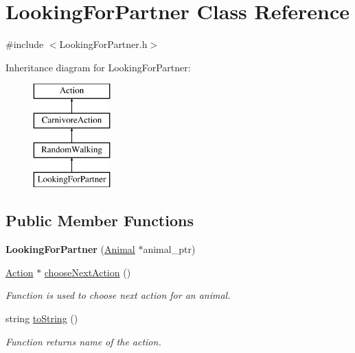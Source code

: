 \hypertarget{class_looking_for_partner}{}\section{Looking\+For\+Partner Class Reference}
\label{class_looking_for_partner}


{\ttfamily \#include $<$Looking\+For\+Partner.\+h$>$}

Inheritance diagram for Looking\+For\+Partner\+:\begin{figure}[H]
\begin{center}
\leavevmode
\includegraphics[height=4.000000cm]{class_looking_for_partner}
\end{center}
\end{figure}
\subsection*{Public Member Functions}
\begin{DoxyCompactItemize}
\item 
\hypertarget{class_looking_for_partner_a52b41dd23b47cdeae8ba927b50aa9403}{}{\bfseries Looking\+For\+Partner} (\hyperlink{class_animal}{Animal} $\ast$animal\+\_\+ptr)\label{class_looking_for_partner_a52b41dd23b47cdeae8ba927b50aa9403}

\item 
\hyperlink{class_action}{Action} $\ast$ \hyperlink{class_looking_for_partner_abd76956136014399c37f8f62c0510795}{choose\+Next\+Action} ()
\begin{DoxyCompactList}\small\item\em Function is used to choose next action for an animal. \end{DoxyCompactList}\item 
string \hyperlink{class_looking_for_partner_a83ef295e8ae6ff29521e0225683bf0af}{to\+String} ()
\begin{DoxyCompactList}\small\item\em Function returns name of the action. \end{DoxyCompactList}\end{DoxyCompactItemize}
